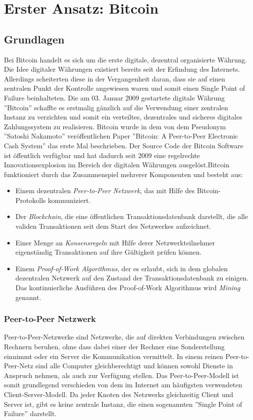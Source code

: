 \chapter{Erster Ansatz: Bitcoin}
\label{btc}

\section{Grundlagen}
\label{btc_grundlagen}
Bei Bitcoin handelt es sich um die erste digitale, dezentral organisierte Währung. Die Idee digitaler Währungen existiert bereits seit der Erfindung des Internets. Allerdings scheiterten diese in der Vergangenheit daran, dass sie auf einen zentralen Punkt der Kontrolle angewiesen waren und somit einen Single Point of Failure beinhalteten. Die am 03. Januar 2009 gestartete digitale Währung ''Bitcoin'' schaffte es erstmalig gänzlich auf die Verwendung einer zentralen Instanz zu verzichten und somit ein verteiltes, dezentrales und sicheres digitales Zahlungssystem zu realisieren. Bitcoin wurde in dem von dem Pseudonym ''Satoshi Nakamoto'' veröffentlichen Paper ''Bitcoin: A Peer-to-Peer Electronic Cash System'' das erste Mal beschrieben. \if Der Source Code der Bitcoin Software ist öffentlich verfügbar und hat dadurch seit 2009 eine regelrechte Innovationsexplosion im Bereich der digitalen Währungen ausgelöst.\fi Bitcoin funktioniert durch das Zusammenspiel mehrerer Komponenten und besteht aus:

\begin{itemize}
\item Einem dezentralen \textit{Peer-to-Peer Netzwerk}, das mit Hilfe des Bitcoin-Protokolls kommuniziert.
\item Der \textit{Blockchain}, die eine öffentlichen Transaktionsdatenbank darstellt, die alle validen Transaktionen seit dem Start des Netzwerkes aufzeichnet.
\item Einer Menge an \textit{Konsensregeln} mit Hilfe derer Netzwerkteilnehmer eigenständig Transaktionen auf ihre Gültigkeit prüfen können.
\item Einem \textit{Proof-of-Work Algorithmus}, der es erlaubt, sich in dem globalen dezentralen Netzwerk auf den Zustand der Transaktionsdatenbank zu einigen. Das kontinuierliche Ausführen des Proof-of-Work Algorithmus wird \textit{Mining} genannt.
\end{itemize}

\subsection{Peer-to-Peer Netzwerk}
Peer-to-Peer-Netzwerke sind Netzwerke, die auf direkten Verbindungen zwischen Rechnern beruhen, ohne dass dabei einer der Rechner eine Sonderstellung einnimmt oder ein Server die Kommunikation vermittelt. In einem reinen Peer-to-Peer-Netz sind alle Computer gleichberechtigt und können sowohl Dienste in Anspruch nehmen, als auch zur Verfügung stellen. Das Peer-to-Peer-Modell ist somit grundlegend verschieden von dem im Internet am häufigsten verwendeten Client-Server-Modell. Da jeder Knoten des Netzwerks gleichzeitig Client und Server ist, gibt es keine zentrale Instanz, die einen sogenannten ''Single Point of Failure'' darstellt. 


